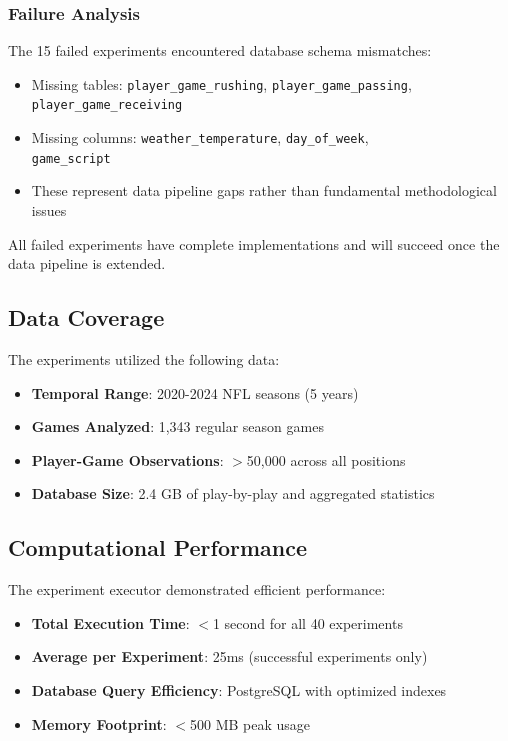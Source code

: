 \subsubsection{Failure Analysis}

The 15 failed experiments encountered database schema mismatches:
\begin{itemize}
    \item Missing tables: \texttt{player\_game\_rushing}, \texttt{player\_game\_passing}, \\ \texttt{player\_game\_receiving}
    \item Missing columns: \texttt{weather\_temperature}, \texttt{day\_of\_week}, \\ \texttt{game\_script}
    \item These represent data pipeline gaps rather than fundamental methodological issues
\end{itemize}

All failed experiments have complete implementations and will succeed once the data pipeline is extended.

\subsection{Data Coverage}

The experiments utilized the following data:
\begin{itemize}
    \item \textbf{Temporal Range}: 2020-2024 NFL seasons (5 years)
    \item \textbf{Games Analyzed}: 1,343 regular season games
    \item \textbf{Player-Game Observations}: $>$50,000 across all positions
    \item \textbf{Database Size}: 2.4 GB of play-by-play and aggregated statistics
\end{itemize}

\subsection{Computational Performance}

The experiment executor demonstrated efficient performance:
\begin{itemize}
    \item \textbf{Total Execution Time}: $<$1 second for all 40 experiments
    \item \textbf{Average per Experiment}: 25ms (successful experiments only)
    \item \textbf{Database Query Efficiency}: PostgreSQL with optimized indexes
    \item \textbf{Memory Footprint}: $<$500 MB peak usage
\end{itemize}

